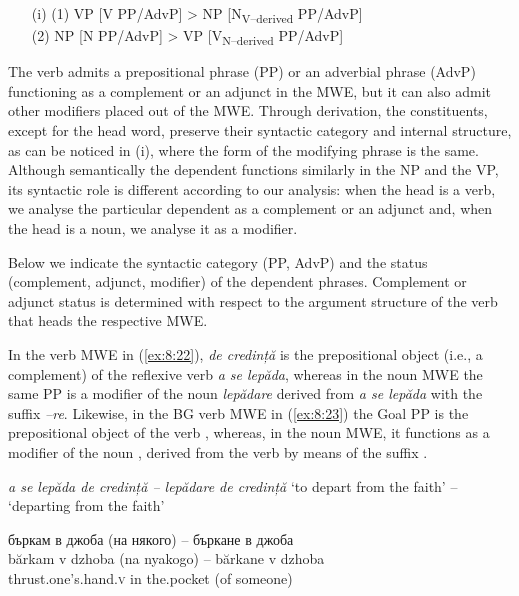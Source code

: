 \documentclass[output=paper]{langsci/langscibook}
\begin{document}
\renewcommand{\theenumi}{(\roman{enumi})}%
\begin{enumerate}
\item[(i)] (1) VP [V PP/AdvP] > NP [N\textsubscript{V–derived }PP/AdvP]\\ 
(2) NP [N PP/AdvP] > VP [V\textsubscript{N–derived} PP/AdvP]
\end{enumerate}


The verb admits a prepositional phrase (PP) or an adverbial phrase
(AdvP) functioning as a complement or an adjunct in the MWE, but it can
also admit other modifiers placed out of the MWE. Through derivation,
the constituents, except for the head word, preserve their syntactic
category and internal structure, as can be noticed in (i), where the
form of the modifying phrase is the same. Although semantically the
dependent functions similarly in the NP and the VP, its syntactic role
is different according to our analysis: when the head is a verb, we
analyse the particular dependent as a complement or an adjunct and,
when the head is a noun, we analyse it as a modifier.



Below we indicate the syntactic category (PP, AdvP) and the status
(complement, adjunct, modifier) of the dependent phrases. Complement or
adjunct status is determined with respect to the argument structure of
the verb that heads the respective MWE.



In the verb MWE in (\ref{ex:8:22}), \textit{de credință} is the prepositional object
(i.e., a complement) of the reflexive verb \textit{a se lepăda}, whereas in
the noun MWE the same PP is a modifier of the noun \textit{lepădare} 
derived from \textit{a se lepăda} with the suffix \textit{–re}. Likewise, in the BG
verb MWE in (\ref{ex:8:23}) the Goal PP 
 is the prepositional object of
the verb 
, whereas, in the noun MWE, it functions as a modifier
of the noun 
, derived from the verb  by means of the
suffix . 



\begin{exe}
\ex \label{ex:8:22}
\settowidth{}
\textit{a se lepăda de credință -- lepădare de credință} 
‘to depart from the faith’ -- ‘departing from the faith’
\end{exe}

\begin{exe}
\ex \label{ex:8:23}
\settowidth{}
\glll бъркам в джоба (на някого) -- бъркане в джоба\\
bărkam v dzhoba (na nyakogo) -- bărkane v dzhoba \\
{thrust.one’s.hand}.\textsc{v} in the.pocket (of someone) \\ 
\end{exe}
\end{document}
